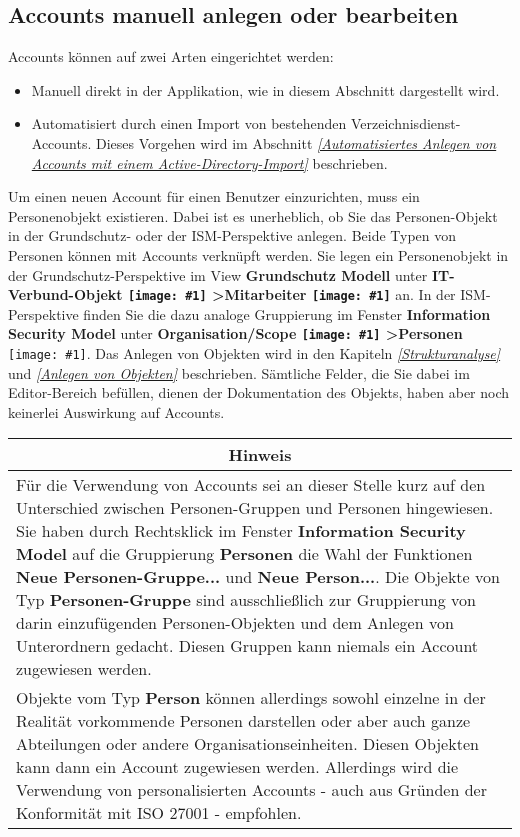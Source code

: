 \documentclass[a4paper,10pt]{book}
\newcommand{\icon}[1]{\texttt{[image: \#1]}}
\begin{document}
\subsection{Accounts manuell anlegen oder bearbeiten} \label{sec:accounts-anlegen}
Accounts können auf zwei Arten eingerichtet werden:
\begin{itemize}
\item Manuell direkt in der Applikation, wie in diesem Abschnitt dargestellt wird.
\item Automatisiert durch einen Import von bestehenden Verzeichnisdienst-Accounts. Dieses Vorgehen wird im Abschnitt
{\em \ref{Automatisiertes Anlegen von Accounts mit einem Active-Directory-Import} } beschrieben.
\end{itemize}
Um einen neuen Account für einen Benutzer einzurichten, muss ein Personenobjekt existieren. Dabei ist es unerheblich, ob Sie das Personen-Objekt in der Grundschutz- oder der ISM-Perspektive anlegen. Beide Typen von Personen können mit Accounts verknüpft werden. Sie legen ein Personenobjekt in der Grundschutz-Perspektive im View \textbf{Grundschutz Modell} unter \textbf{IT-Verbund-Objekt
\icon{Icon/GS_Modell.png} \textgreater Mitarbeiter \icon{Icon/Mitarbeiter.png}} an. In der
ISM-Perspektive finden Sie die dazu analoge Gruppierung im Fenster \textbf{Information Security Model} unter
\textbf{Organisation/Scope \icon{Icon/GS_Modell.png} \textgreater Personen} \icon{Icon/Mitarbeiter.png}. Das Anlegen von Objekten wird in den Kapiteln {\em \ref{Strukturanalyse} } und
{\em \ref{Anlegen von Objekten} } beschrieben. Sämtliche Felder, die Sie dabei im Editor-Bereich befüllen, dienen der Dokumentation des Objekts, haben aber noch keinerlei Auswirkung auf Accounts.
\newline\\

\begin{longtable}{| p{} |}
\hline
\multicolumn{1}{|c|}{\textbf{Hinweis}} \\
\hline\hline
 Für die Verwendung von Accounts sei an dieser Stelle kurz auf den Unterschied zwischen Personen-Gruppen und Personen hingewiesen. Sie haben
durch Rechtsklick im Fenster \textbf{Information Security Model} auf die Gruppierung \textbf{Personen} die Wahl der Funktionen
\textbf{Neue Personen-Gruppe...} und \textbf{Neue Person...}. Die Objekte von Typ \textbf{Personen-Gruppe} sind ausschließlich
zur Gruppierung von darin einzufügenden Personen-Objekten und dem Anlegen von Unterordnern gedacht. Diesen Gruppen kann niemals
ein Account zugewiesen werden.
\newline\\
Objekte vom Typ \textbf{Person} können allerdings sowohl einzelne in der Realität vorkommende Personen darstellen oder aber auch ganze Abteilungen oder andere Organisationseinheiten. Diesen Objekten kann dann ein Account zugewiesen werden. Allerdings wird die Verwendung von personalisierten Accounts - auch aus Gründen der Konformität mit ISO 27001 - empfohlen. \\[10pt] \hline
\end{longtable}
\end{document}

